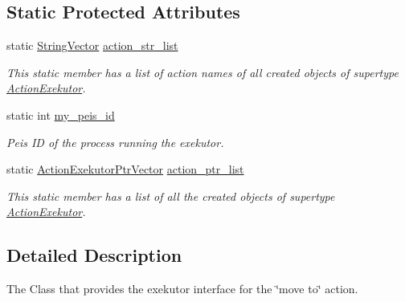 \subsection*{\-Static \-Protected \-Attributes}
\begin{DoxyCompactItemize}
\item 
static \hyperlink{namespaceexekutor_a58d8a9cd227883a8eacb6400c9f62acb}{\-String\-Vector} \hyperlink{classexekutor_1_1ActionExekutor_a0dc39a7a2a3a67d2bdd366f9e6e682a2}{action\-\_\-str\-\_\-list}
\begin{DoxyCompactList}\small\item\em \-This static member has a list of action names of all created objects of supertype \hyperlink{classexekutor_1_1ActionExekutor}{\-Action\-Exekutor}. \end{DoxyCompactList}\item 
static int \hyperlink{classexekutor_1_1ActionExekutor_a31644a88e4d0166c2d3a70bab9eb5b99}{my\-\_\-peis\-\_\-id}
\begin{DoxyCompactList}\small\item\em \-Peis \-I\-D of the process running the exekutor. \end{DoxyCompactList}\item 
static \hyperlink{namespaceexekutor_a141a8f9a739e67ffb2356da18a653162}{\-Action\-Exekutor\-Ptr\-Vector} \hyperlink{classexekutor_1_1ActionExekutor_a73c4f2607b0725f5b201cf501cb42578}{action\-\_\-ptr\-\_\-list}
\begin{DoxyCompactList}\small\item\em \-This static member has a list of all the created objects of supertype \hyperlink{classexekutor_1_1ActionExekutor}{\-Action\-Exekutor}. \end{DoxyCompactList}\end{DoxyCompactItemize}


\subsection{\-Detailed \-Description}
\-The \-Class that provides the exekutor interface for the \char`\"{}move to\char`\"{} action. 

